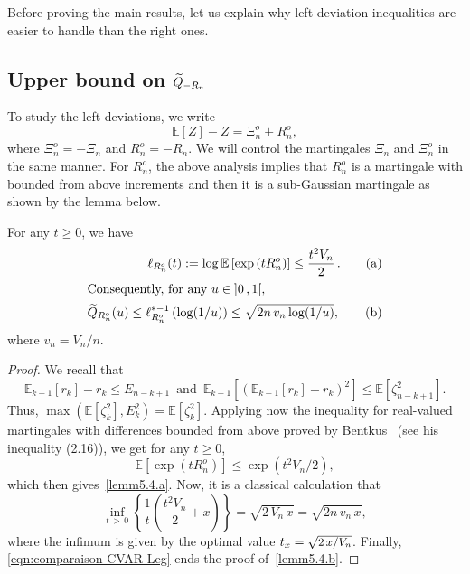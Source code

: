 \documentclass[AHL,Unicode,longabstracts,published]{cedram}
\newcommand{\bE}{\mathbb{E}}
\newcommand{\intervalleoo}[2]{\mathopen{]} #1\mathclose{}\mathpunct{},#2\mathclose{[}}
\let\oldtilde\tilde
\renewcommand*{\tilde}[1]{\mathchoice{\widetilde{#1}}{\widetilde{#1}}{\oldtilde{#1}}{\oldtilde{#1}}}
\begin{document}
Before proving the main results, let us explain why left deviation inequalities are easier to handle than the right ones.

\subsection{Upper bound on \texorpdfstring{$\tilde Q_{-R_n}$}{}}

To study the left deviations, we write
\begin{equation}\label{eqn:decomposition martingale}
\bE[Z]-Z=\Xi_n^o +R_n^o,
\end{equation}
where $\Xi_n^o=-\Xi_n$ and $R_n^o=-R_n$. We will control the martingales $\Xi_n$ and $\Xi_n^o$ in the same manner. For $R_n^o$, the above analysis implies that $R_n^o$ is a martingale with bounded from above increments and then it is a sub-Gaussian martingale as shown by the lemma below.

\begin{lemm}\label{lem:bound log-laplace R_n}
For any $t\geq 0$, we have
\begin{align}
\ell_{R_n^o}(t):=\log\bE\left[\exp\left(tR_n^o\right)\right]\leq \frac{t^2V_n}{2}\,.\tag{$\rm a$}\label{lemm5.4.a}
\\
\intertext{Consequently, for any $u\in \intervalleoo 01$,}
\tilde Q_{R_n^o}(u)\leq \ell_{R_n^o}^{*-1}\left(\log(1/u)\right)\leq \sqrt{2n\,v_n\log(1/u)},\tag{$\rm b$}\label{lemm5.4.b}
\end{align}
where $v_n=V_n/n$.
\end{lemm}


\begin{proof}
We recall that
\begin{equation}\label{eqn:proof lemma R_n eqn1}
\bE_{k-1}[r_k]-r_k\leq E_{n-k+1}\,\text{ and }\, \bE_{k-1}\left[\left(\bE_{k-1}[r_k]-r_k\right)^2\right]\leq \bE\left[\zeta_{n-k+1}^2\right].
\end{equation}
Thus, $\max(\bE[\zeta_k^2],E_k^2)=\bE[\zeta_k^2]$. Applying now the inequality for real-valued martingales with differences bounded from above proved by Bentkus~\cite{Bentkus03} (see his inequality (2.16)), we get for any $t\geq 0$,
\begin{equation}\label{eqn:proof lemma R_n eqn3}
\bE\left[\exp\left(tR_n^o\right)\right]\leq \exp\left(t^2V_n/2\right),
\end{equation}
which then gives~\eqref{lemm5.4.a}. Now, it is a classical calculation that
\begin{equation}
\inf_{t\,>\,0}\left\{\frac 1t \left(\frac{t^2V_n}{2}+x\right)\right\}=\sqrt{2\,V_n\,x}=\sqrt{2n\,v_n\,x},
\end{equation}
where the infimum is given by the optimal value $t_x=\sqrt{\text{\small{$2\,x/V_n$}}}$. Finally, \eqref{eqn:comparaison CVAR Leg} ends the proof of~\eqref{lemm5.4.b}.
\end{proof}
\end{document}
